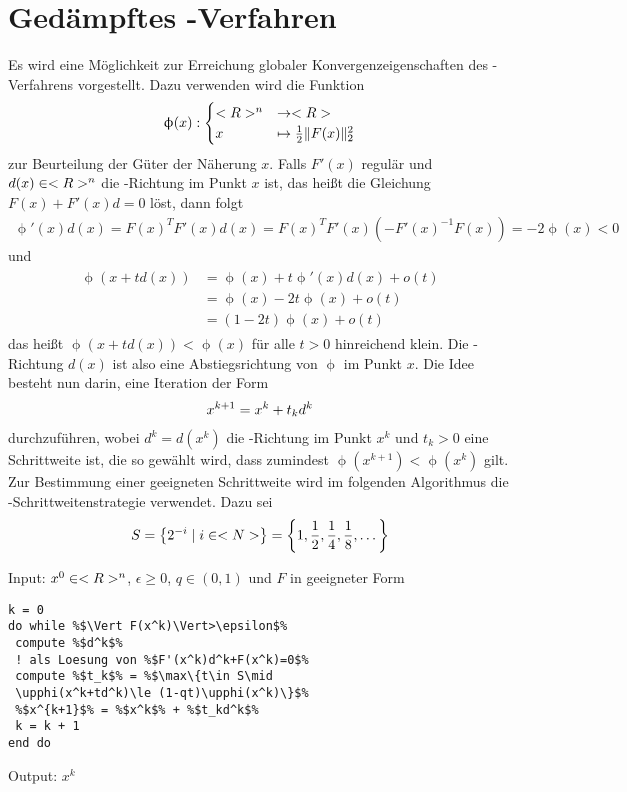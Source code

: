 \section{Gedämpftes -Verfahren}

Es wird eine Möglichkeit zur Erreichung globaler Konvergenzeigenschaften des -Verfahrens vorgestellt. Dazu verwenden wird die Funktion
\begin{align}
	\upphi(x): \begin{cases}
		<R>^n&\to <R> \\
		x&\mapsto \frac{1}{2}\Vert F(x)\Vert_2^2
	\end{cases}\notag
\end{align}
zur Beurteilung der Güter der Näherung $x$. Falls $F'(x)$ regulär und $d(x)\in<R>^n$ die -Richtung im Punkt $x$ ist, das heißt die Gleichung $F(x)+F'(x)d=0$ löst, dann folgt
\begin{align}
	\label{5.6}
	\upphi'(x)d(x) = F(x)^TF'(x)d(x) = F(x)^TF'(x)\left(-F'(x)^{-1}F(x)\right) = -2\upphi(x)< 0
\end{align}
und
\begin{align}
	\label{5.7}
	\begin{split}
		\upphi(x+td(x)) &= \upphi(x) + t\upphi'(x)d(x)+o(t) \\
		&= \upphi(x) - 2t\upphi(x) + o(t) \\
		&= (1-2t)\upphi(x) + o(t)
	\end{split}
\end{align}
das heißt $\upphi(x+td(x))<\upphi(x)$ für alle $t>0$ hinreichend klein. Die -Richtung $d(x)$ ist also eine Abstiegsrichtung von $\upphi$ im Punkt $x$. Die Idee besteht nun darin, eine Iteration der Form
\begin{align}
	x^{k+1} = x^k + t_kd^k\notag
\end{align}
durchzuführen, wobei $d^k=d(x^k)$ die -Richtung im Punkt $x^k$ und $t_k>0$ eine Schrittweite ist, die so gewählt wird, dass zumindest $\upphi(x^{k+1})<\upphi(x^k)$ gilt. Zur Bestimmung einer geeigneten Schrittweite wird im folgenden Algorithmus die -Schrittweitenstrategie verwendet. Dazu sei
\begin{align}
	S = \left\lbrace 2^{-i}\mid i\in<N>\right\rbrace = \left\lbrace 1, \frac{1}{2}, \frac{1}{4}, \frac{1}{8}, \dots\right\rbrace \notag
\end{align}

\begin{algorithm}
	Input: $x^0\in<R>^n$, $\epsilon\ge 0$, $q\in (0,1)$ und $F$ in geeigneter Form
	\begin{lstlisting}
k = 0
do while %$\Vert F(x^k)\Vert>\epsilon$%
 compute %$d^k$%
 ! als Loesung von %$F'(x^k)d^k+F(x^k)=0$%
 compute %$t_k$% = %$\max\{t\in S\mid 
 \upphi(x^k+td^k)\le (1-qt)\upphi(x^k)\}$%
 %$x^{k+1}$% = %$x^k$% + %$t_kd^k$%
 k = k + 1
end do
	\end{lstlisting}
	Output: $x^k$
\end{algorithm}

